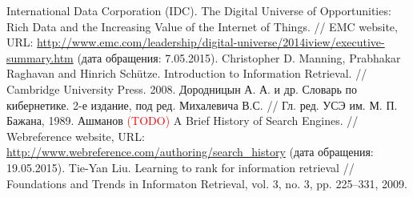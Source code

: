 \documentclass[12pt,a4paper]{report}
\renewcommand{\bibname}{Список литературы}
\newcommand\note[1]{\textcolor{red}{(#1)}}
\begin{document}
\renewcommand{\bibname}{Список литературы}
\begin{thebibliography}{@}
  International Data Corporation (IDC). The Digital Universe of Opportunities: Rich Data and the Increasing Value of the Internet of Things. // EMC website,
  URL: \url{http://www.emc.com/leadership/digital-universe/2014iview/executive-summary.htm} (дата обращения: 7.05.2015).
  Christopher D. Manning, Prabhakar Raghavan and Hinrich Schütze. Introduction to Information Retrieval. // Cambridge University Press. 2008. %
  Дородницын А. А. и др. Словарь по кибернетике. 2-е издание, под ред. Михалевича В.С. // Гл. ред. УСЭ им. М. П. Бажана, 1989. %
  Ашманов \note{TODO}
  A Brief History of Search Engines. // Webreference website, 
  URL: \url{http://www.webreference.com/authoring/search_history} (дата обращения: 19.05.2015).
  Tie-Yan Liu. Learning to rank for information retrieval // Foundations and Trends in Informaton Retrieval, vol. 3, no. 3, pp. 225–331, 2009.
\end{thebibliography}
\end{document}
